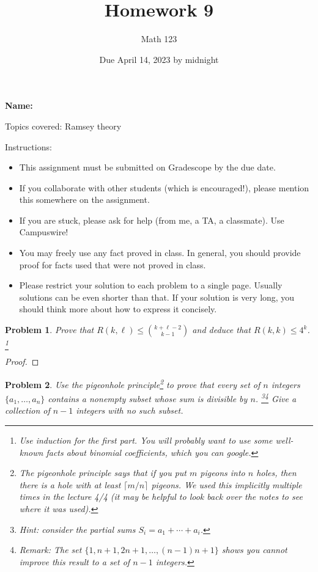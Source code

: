 \documentclass[11pt]{article}
\author{Math 123}
\date{Due April 14, 2023 by midnight}
\title{Homework 9}
\newtheorem{problem}{Problem}
\begin{document}
\maketitle

{\bf\Large Name:} 


\vspace{.3in}
Topics covered: Ramsey theory

Instructions: 
\begin{itemize}
\item This assignment must be submitted on Gradescope by the due date. 
\item If you collaborate with other students (which is encouraged!), please mention this somewhere on the assignment. 
\item If you are stuck, please ask for help (from me, a TA, a classmate). Use Campuswire!  
\item You may freely use any fact proved in class. In general, you should provide proof for facts used that were not proved in class. 
\item Please restrict your solution to each problem to a single page. Usually solutions can be even shorter than that. If your solution is very long, you should think more about how to express it concisely.
\end{itemize}


\pagebreak 


\begin{problem}
Prove that $R(k,\ell)\le{k+\ell-2\choose k-1}$ and deduce that $R(k,k)\le 4^k$. \footnote{Use induction for the first part. You will probably want to use some well-known facts about binomial coefficients, which you can google.} 
\end{problem}

\begin{proof} 

\end{proof}

\pagebreak


\begin{problem}
Use the pigeonhole principle\footnote{The pigeonhole principle says that if you put $m$ pigeons into $n$ holes, then there is a hole with at least $\lceil m/n\rceil$ pigeons. We used this implicitly multiple times in the lecture 4/4 (it may be helpful to look back over the notes to see where it was used). } to prove that every set of $n$ integers $\{a_1,\ldots,a_n\}$ contains a nonempty subset whose sum is divisible by $n$. \footnote{Hint: consider the partial sums $S_i=a_1+\cdots+a_i$.}\footnote{Remark: The set $\{1,n+1,2n+1,\ldots,(n-1)n+1\}$ shows you cannot improve this result to a set of $n-1$ integers.} Give a collection of $n-1$ integers with no such subset. 
\end{problem}
\end{document}
